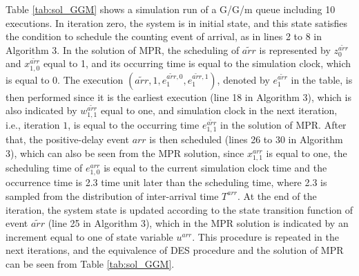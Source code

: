 \documentclass[suppldata]{interact}
\theoremstyle{plain}
\theoremstyle{definition}
\theoremstyle{remark}
\begin{document}
Table \ref{tab:sol_GGM} shows a simulation run of a G/G/m queue including 10 executions. In iteration zero, the system is in initial state, and this state satisfies the condition to schedule the counting event of arrival, as in lines 2 to 8 in Algorithm 3. In the solution of MPR, the scheduling of $\tilde{arr}$ is represented by $z^{\tilde{arr}}_0$ and $x^{\tilde{arr}}_{1,0}$ equal to 1, and its occurring time is equal to the simulation clock, which is equal to 0. The execution $(\tilde{arr}, 1, e^{\tilde{arr},0}_1, e^{\tilde{arr},1}_1)$, denoted by $e^{\tilde{arr}}_1$ in the table, is then performed since it is the earliest execution (line 18 in Algorithm 3), which is also indicated by $w^{\tilde{arr}}_{1,1}$ equal to one, and simulation clock in the next iteration, i.e., iteration $1$, is equal to the occurring time $e^{\tilde{arr}}_{1,1}$ in the solution of MPR. After that, the positive-delay event $arr$ is then scheduled (lines 26 to 30 in Algorithm 3), which can also be seen from the MPR solution, since $x^{arr}_{1,1}$ is equal to one, the scheduling time of $e^{arr}_{1,0}$ is equal to the current simulation clock time and the occurrence time is 2.3 time unit later than the scheduling time, where 2.3 is sampled from the distribution of inter-arrival time $T^{arr}$. At the end of the iteration, the system state is updated according to the state transition function of event $\tilde{arr}$ (line 25 in Algorithm 3), which in the MPR solution is indicated by an increment equal to one of state variable $u^{arr}$. This procedure is repeated in the next iterations, and the equivalence of DES procedure and the solution of MPR can be seen from Table \ref{tab:sol_GGM}. 
\end{document}
